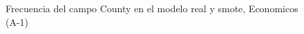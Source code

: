 \begin{figure}[H]
    \centering
    
    \caption{Frecuencia del campo County en el modelo real y smote, Economicos (A-1)}
    \label{frecuency-County-smote-enc}
\end{figure}